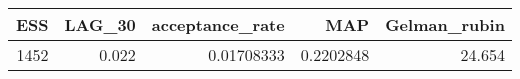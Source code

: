 \begin{longtable}{rrrrr}
\toprule
ESS & LAG\_30 & acceptance\_rate & MAP & Gelman\_rubin \\ 
\midrule
1452 & 0.022 & 0.01708333 & 0.2202848 & 24.654 \\ 
\bottomrule
\end{longtable}

